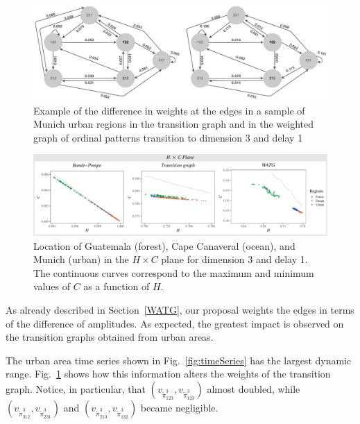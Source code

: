\documentclass[journal]{IEEEtran}
\begin{document}
	\begin{figure}[hbt]
		\includegraphics[width=2\columnwidth]{Figures/graphs.pdf}
		\caption{Example of the difference in weights at the edges in a sample of Munich urban regions in the transition graph and in the weighted graph of ordinal patterns
			transition to dimension 3 and delay 1}
		\label{fig:graphs}
	\end{figure}
	
	\begin{figure}[hbt]
		\includegraphics[width=2\columnwidth]{Figures/HCAnalysis.pdf}
		\caption{Location of Guatemala (forest), Cape Canaveral (ocean), and Munich (urban) in the $H \times C$ plane for dimension 3 and delay 1. 
			The continuous curves correspond to the maximum and minimum values of $C$ as a function of $H$.}
		\label{fig:plotsHC}
	\end{figure}
	
	As already described in Section~\ref{WATG}, our proposal weights the edges in terms of the difference of amplitudes.
	As expected, the greatest impact is observed on the transition graphs obtained from urban areas.
	
	The urban area time series shown in Fig.~\ref{fig:timeSeries} has the largest dynamic range.
	Fig.~\ref{fig:graphs} shows how this information alters the weights of the transition graph.
	Notice, in particular, that 
	$(v_{\widetilde \pi^3_{123}}, v_{\widetilde \pi^3_{123}})$ almost doubled, while 
	$(v_{\widetilde \pi^3_{312}}, v_{\widetilde \pi^3_{231}})$ and $(v_{\widetilde \pi^3_{213}}, v_{\widetilde \pi^3_{132}})$ became negligible.
	
\end{document}
